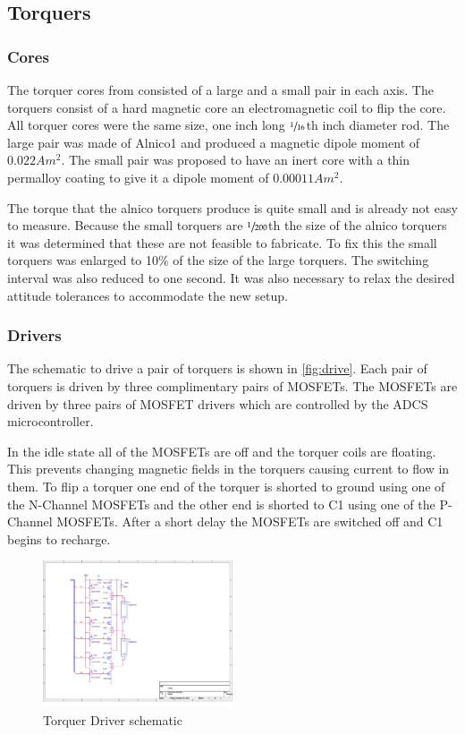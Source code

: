 \subsection{Torquers}

\subsubsection{Cores}

The torquer cores from \cite{Mentch11} consisted of a large and a small pair in each axis. The torquers consist of a hard magnetic core an electromagnetic coil to flip the core. All torquer cores were the same size, one inch long $\sfrac{1}{16}$th inch diameter rod. The large pair was made of Alnico1 and produced a magnetic dipole moment of $0.022 \unit{A m^2}$. The small pair was proposed to have an inert core with a thin permalloy coating to give it a dipole moment of $0.00011 \unit{A m^2}$.

The torque that the alnico torquers produce is quite small and is already not easy to measure. Because the small torquers are $\sfrac{1}{200}$th the size of the alnico torquers it was determined that these are not feasible to fabricate. To fix this the small torquers was enlarged to 10\% of the size of the large torquers. The switching interval was also reduced to one second. It was also necessary to relax the desired attitude tolerances to accommodate the new setup.

\subsubsection{Drivers}

The schematic to drive a pair of torquers is shown in \autoref{fig:drive}. Each pair of torquers is driven by three complimentary pairs of \acp{MOSFET}.  The \acp{MOSFET} are driven by three pairs of \ac{MOSFET} drivers which are controlled by the \ac{ADCS} microcontroller.

In the idle state all of the \acp{MOSFET} are off and the torquer coils are floating. This prevents changing magnetic fields in the torquers causing current to flow in them. To flip a torquer one end of the torquer is shorted to ground using one of the N-Channel \acp{MOSFET} and the other end is shorted to C1 using one of the P-Channel \acp{MOSFET}. After a short delay the \acp{MOSFET} are switched off and C1 begins to recharge.

\begin{figure}[H]
    \centering
    \includegraphics[width=0.5\textwidth]{Figures/driverSchematic}
    \caption{Torquer Driver schematic}
    \label{fig:drive}
\end{figure}

